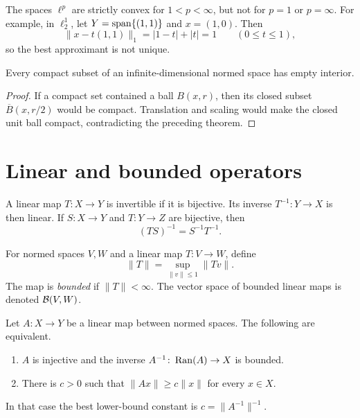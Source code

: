 \begin{noteexample}
The spaces $\ell^p$ are strictly convex for $1<p<\infty$, but not for
$p=1$ or $p=\infty$.  For example, in $\ell^1_2$, let
$Y=\operatorname{span}\{(1,1)\}$ and $x=(1,0)$.  Then
\[
  \|x-t(1,1)\|_1=|1-t|+|t|=1
  \qquad(0\le t\le1),
\]
so the best approximant is not unique.
\end{noteexample}

\begin{notetheorem}
Every compact subset of an infinite-dimensional normed space has empty
interior.
\end{notetheorem}

\begin{proof}
If a compact set contained a ball $B(x,r)$, then its closed subset
$\overline B(x,r/2)$ would be compact.  Translation and scaling would make
the closed unit ball compact, contradicting the preceding theorem.
\end{proof}

\section{Linear and bounded operators}

\begin{notedefinition}
A linear map $T\colon X\to Y$ is invertible if it is bijective.  Its inverse
$T^{-1}\colon Y\to X$ is then linear.  If $S\colon X\to Y$ and
$T\colon Y\to Z$ are bijective, then
\[
  (TS)^{-1}=S^{-1}T^{-1}.
\]
\end{notedefinition}

\begin{notedefinition}
For normed spaces $V,W$ and a linear map $T\colon V\to W$, define
\[
  \|T\|=\sup_{\|v\|\le1}\|Tv\|.
\]
The map is \emph{bounded} if $\|T\|<\infty$.  The vector space of bounded
linear maps is denoted $\mathcal{B}(V,W)$.
\end{notedefinition}

\begin{notetheorem}
Let $A\colon X\to Y$ be a linear map between normed spaces.  The following
are equivalent.
\begin{enumerate}
  \item $A$ is injective and the inverse
        $A^{-1}\colon\operatorname{Ran}(A)\to X$ is bounded.
  \item There is $c>0$ such that
        $\|Ax\|\ge c\|x\|$ for every $x\in X$.
\end{enumerate}
In that case the best lower-bound constant is $c=\|A^{-1}\|^{-1}$.
\end{notetheorem}

